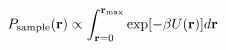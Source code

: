 \documentclass[12pt]{article}
\begin{document}
\begin{displaymath}
P_{\rm sample}({\bf r}) \propto
{
{
\int_{{\bf r}=0}^{{\bf r}_{\rm max}} { \exp[-\beta U({\bf r}) ] } d{\bf r}
}
}
\end{displaymath}
\end{document}

